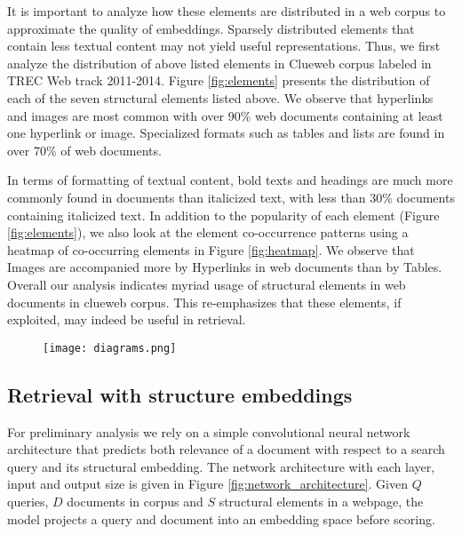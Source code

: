 It is important to analyze how these elements are distributed in a web corpus 
to approximate the quality of embeddings. Sparsely distributed elements that contain 
less textual content may not yield useful representations. Thus, we 
first analyze the distribution of above listed elements in Clueweb corpus labeled in 
TREC Web track 2011-2014. 
Figure \ref{fig:elements} presents the distribution of each of the seven 
structural elements listed above. We observe that hyperlinks and images are most 
common with over 90\% web documents containing at least one hyperlink or image. 
Specialized formats such as tables and lists are found in over 70\% of web 
documents.

In terms of formatting of textual content, bold texts and headings 
are much more commonly found in documents than italicized text, with less than 
30\% documents containing italicized text. In addition to the popularity of each 
element (Figure \ref{fig:elements}), we also look at the element co-occurrence 
patterns using a heatmap of co-occurring elements in Figure 
\ref{fig:heatmap}. We observe that Images are accompanied more by Hyperlinks in 
web documents than by Tables. Overall our analysis indicates myriad usage of 
structural elements in web documents in clueweb corpus. This re-emphasizes that 
these elements, if exploited, may indeed be useful in retrieval.  
    \begin{figure*}
    \centering
    \caption{Network architecture}
    \label{fig:network_architecture}
    \begin{subfigure}[b]{0.70\textwidth}
    \texttt{[image: diagrams.png]}
    \end{subfigure}
    \end{figure*}
\subsection{Retrieval with structure embeddings}
For preliminary analysis we rely on a simple convolutional neural 
network architecture that predicts both relevance of a document with 
respect to a search query and its structural embedding. 
The network architecture with each layer, input and output size 
is given in Figure \ref{fig:network_architecture}. 
Given $\mathit{Q}$ queries, $\mathit{D}$ documents in corpus and $\mathit{S}$ 
structural elements in a webpage, the model projects a query 
and document into an embedding space before scoring.

